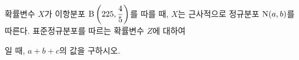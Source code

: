 확률변수 $X$가 이항분포 $\mathrm{B}\left(225{,}\mkern3mu\mathopen{}\dfrac{4}{5}\right)$를 따를 때, $X$는 근사적으로 정규분포 $\mathrm{N}(a{,}\mkern3mu\mathopen{}b)$를 따른다. 표준정규분포를 따르는 확률변수 $Z$에 대하여 \par\smallskip{}\par\smallskip\noindent 일 때, $a+b+c$의 값을 구하시오. 

